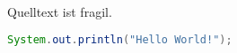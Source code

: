 \begin{frame}[fragile]{Quelltext ist fragil.}
  \begin{lstlisting}[gobble=4,language=Java]
    System.out.println("Hello World!");
  \end{lstlisting}
\end{frame}
